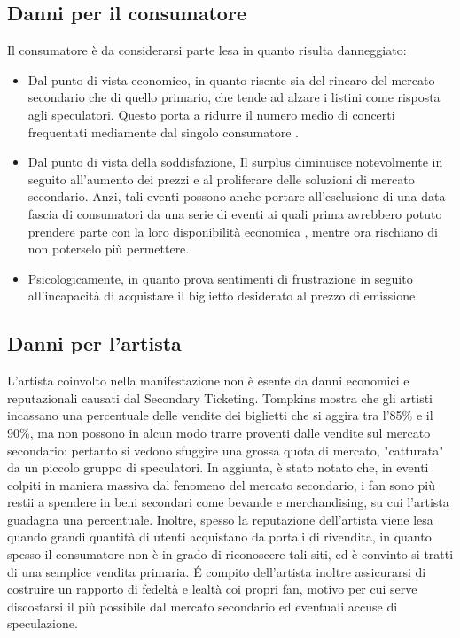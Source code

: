 \subsection{Danni per il consumatore}
Il consumatore è da considerarsi parte lesa in quanto risulta danneggiato: 
\begin{itemize}
\item Dal punto di vista economico, in quanto risente sia del rincaro del mercato secondario che di quello primario, che tende ad alzare i listini come risposta agli speculatori. Questo porta a ridurre il numero medio di concerti frequentati mediamente dal singolo consumatore \cite{eckard2013impact}.
\item Dal punto di vista della soddisfazione, Il surplus diminuisce notevolmente in seguito all'aumento dei prezzi e al proliferare delle soluzioni di mercato secondario. Anzi, tali eventi possono anche portare all'esclusione di una data fascia di consumatori da una serie di eventi ai quali prima avrebbero potuto prendere parte con la loro disponibilità economica \cite{perez2016music}, mentre ora rischiano di non poterselo più permettere.
\item Psicologicamente, in quanto prova sentimenti di frustrazione in seguito all'incapacità di acquistare il biglietto desiderato al prezzo di emissione. 
\end{itemize}

\subsection{Danni per l'artista}
L'artista coinvolto nella manifestazione non è esente da danni economici e reputazionali causati dal Secondary Ticketing. Tompkins  \cite{tompkins2018ticket} mostra che gli artisti incassano una percentuale delle vendite dei biglietti che si aggira tra l'85\% e il 90\%, ma non possono in alcun modo trarre proventi dalle vendite sul mercato secondario: pertanto si vedono sfuggire una grossa quota di mercato, "catturata" da un piccolo gruppo di speculatori. In aggiunta, è stato notato che, in eventi colpiti in maniera massiva dal fenomeno del mercato secondario, i fan sono più restii a spendere in beni secondari come bevande e merchandising, su cui l'artista guadagna una percentuale. Inoltre, spesso la reputazione dell'artista viene lesa quando grandi quantità di utenti acquistano da portali di rivendita, in quanto spesso il consumatore non è in grado di riconoscere tali siti, ed è convinto si tratti di una semplice vendita primaria. 
\'E compito dell'artista inoltre assicurarsi di costruire un rapporto di fedeltà e lealtà coi propri fan, motivo per cui serve discostarsi il più possibile dal mercato secondario ed eventuali accuse di speculazione. 

